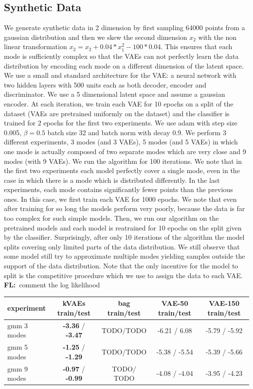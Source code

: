 \documentclass{article}
\newcommand{\FL}[1]{\textbf{\color{violet}FL:}{~\color{cyan}#1}}
\begin{document}
\subsection{Synthetic Data}
We generate synthetic data in 2 dimension by first sampling 64000 points from a gaussian distribution and then we skew the second dimension $x_2$ with the non linear transformation $x_2 = x_2 +  0.04 * x_1^2 - 100 *  0.04$. This ensures that each mode is sufficiently complex so that the VAEs can not perfectly learn the data distribution by encoding each mode on a different dimension of the latent space. We use a small and standard architecture for the VAE: a neural network with two hidden layers with 500 units each as both decoder, encoder and discriminator.
We use a 5 dimensional latent space and assume a gaussian encoder. At each iteration, we train each VAE for 10 epochs on a split of the dataset (VAEs are pretrained uniformly on the dataset) and the classifier is trained for 2 epochs for the first two experiments. We use adam with step size 0.005, $\beta = 0.5$ batch size 32 and batch norm with decay $0.9$. We perform 3 different experiments, 3 modes (and 3 VAEs), 5 modes (and 5 VAEs) in which one mode is actually composed of two separate modes which are very close and 9 modes (with 9 VAEs). We run the algorithm for 100 iterations. We note that in the first two experiments each model perfectly cover a single mode, even in the case in which there is a mode which is distributed differently. In the last experiments, each mode contains significantly fewer points than the previous ones. In this case, we first train each VAE for 1000 epochs. We note that even after training for so long the models perform very poorly, because the data is far too complex for such simple models. Then, we run our algorithm on the pretrained models and each model is reatrained for 10 epochs on the split given by the classifier. Surprisingly, after only 10 iterations of the algorithm the model splits covering only limited parts of the data distribution. We still observe that some model still try to approximate multiple modes yielding samples outside the support of the data distribution. Note that the only incentive for the model to split is the competitive procedure which we use to assign the data to each VAE. \FL{comment the log likelihood}
\begin{table}
\begin{center}
\begin{tabular}{ l | c | c | c | c  }
  experiment & kVAEs train/test & bag train/test & VAE-50 train/test & VAE-150 train/test\\
  \hline
  gmm 3 modes & \textbf{-3.36} / \textbf{-3.47} & TODO/TODO &-6.21 / 6.08 & -5.79 / -5.92\\			
  gmm 5 modes & \textbf{-1.25} / \textbf{-1.29} & TODO/TODO & -5.38 / -5.54 & -5.39 / -5.66\\
  gmm 9 modes & \textbf{-0.97} / \textbf{ -0.99} & TODO/ TODO & -4.08 / -4.04 & -3.95 / -4.23\\  
\end{tabular}
\end{center}
\end{table}
\end{document}
